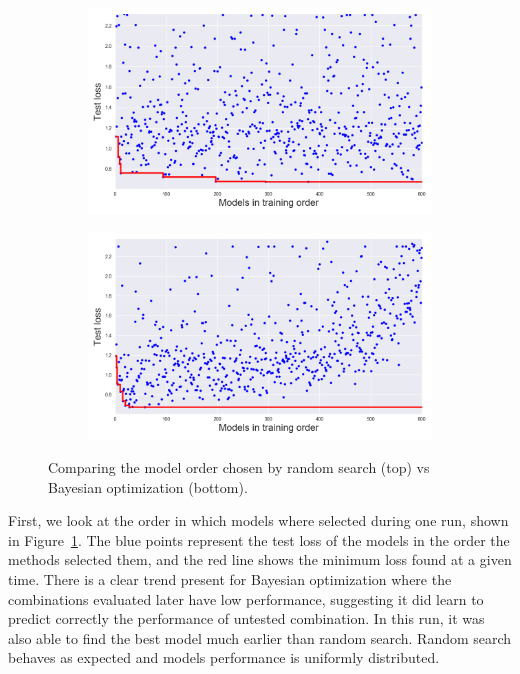 \begin{figure}[htbp]
	\begin{subfigure}[b]{\textwidth}
            \centering
            \includegraphics[width=\linewidth]{img_hyperopt/cifar_random}
    \end{subfigure}%
    
    \begin{subfigure}[b]{\textwidth}
            \centering
            \includegraphics[width=\linewidth]{img_hyperopt/cifar_bo}
    \end{subfigure}%
    \caption{Comparing the model order chosen by random search (top) vs Bayesian optimization (bottom).}
	\label{fig:cifar_loss}
\end{figure}

First, we look at the order in which models where selected during one run, shown in Figure~\ref{fig:cifar_loss}. The blue points represent the test loss of the models in the order the methods selected them, and the red line shows the minimum loss found at a given time. There is a clear trend present for Bayesian optimization where the combinations evaluated later have low performance, suggesting it did learn to predict correctly the performance of untested combination. In this run, it was also able to find the best model much earlier than random search. Random search behaves as expected and models performance is uniformly distributed.

